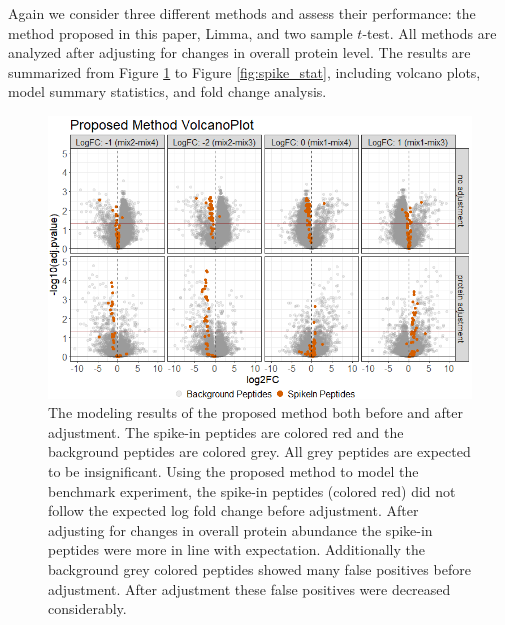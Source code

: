 \documentclass{mcp}
\begin{document}
Again we consider three different methods and assess their performance: the method proposed in this paper, Limma, and two sample $t$-test. All methods are analyzed after adjusting for changes in overall protein level. The results are summarized from Figure \ref{fig:spike_volcano_msstats} to Figure \ref{fig:spike_stat}, including volcano plots, model summary statistics, and fold change analysis.

\begin{figure}[h!]
\centering
\includegraphics[width=.85\textwidth]{sim_new/spike_in_msstatsptm_volcano}
\caption{The modeling results of the proposed method both before and after adjustment. The spike-in peptides are colored red and the background peptides are colored grey. All grey peptides are expected to be insignificant. Using the proposed method to model the benchmark experiment, the spike-in peptides (colored red) did not follow the expected log fold change before adjustment. After adjusting for changes in overall protein abundance the spike-in peptides were more in line with expectation. Additionally the background grey colored peptides showed many false positives before adjustment. After adjustment these false positives were decreased considerably. \label{fig:spike_volcano_msstats}}
\end{figure}
\end{document}
